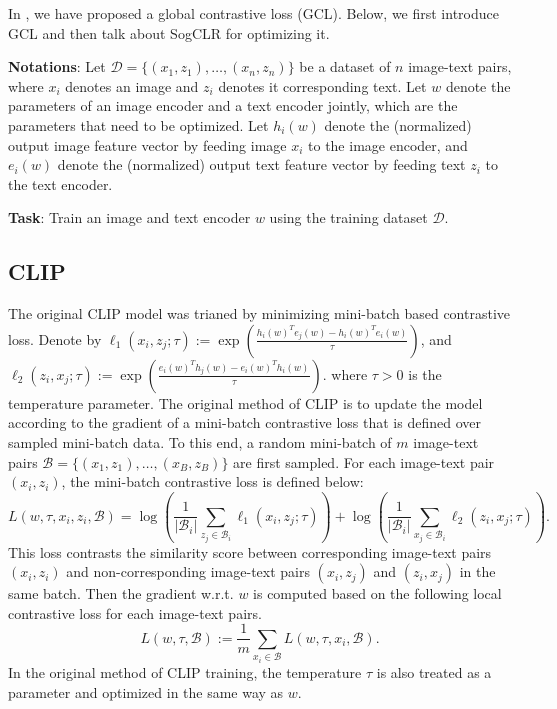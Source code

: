 \documentclass{article}
\begin{document}
In \cite{yuan2022provable}, we have proposed a global contrastive loss (GCL). Below, we first introduce GCL and then talk about SogCLR for optimizing it.

\textbf{Notations}: Let \(\mathcal{D}= \{ (x_1, z_1), \ldots, (x_n, z_n)\}\) be a dataset of \(n\) image-text pairs, where \(x_i\) denotes an image and \(z_i\) denotes it corresponding text. Let \(w\) denote the parameters of an image encoder and a text encoder jointly, which are the parameters that need to be optimized. Let \(h_i(w)\) denote the (normalized) output image feature vector by feeding image \(x_i\) to the image encoder, and \(e_i(w)\) denote the (normalized) output text feature vector by feeding text \(z_i\) to the text encoder.

\textbf{Task}: Train an image and text encoder \(w\) using the training dataset \(\mathcal{D}\).

\subsection{CLIP}
The original CLIP model was trianed by minimizing mini-batch based contrastive loss. 
Denote by  $\ell_1(x_i, z_j; \tau):= \exp(\frac{h_i(w)^Te_j(w)- h_i(w)^Te_i(w)}{\tau})$, and  $\ell_2(z_i, x_j; \tau):= \exp(\frac{e_i(w)^Th_j(w)- e_i(w)^Th_i(w)}{\tau})$. 
where \(\tau> 0\) is the temperature parameter. The original method of CLIP is to update the model according to the gradient of a  mini-batch  contrastive loss that is defined over sampled mini-batch data. To this end, a random mini-batch of \(m\) image-text pairs \(\mathcal{B}= \{ (x_1, z_1), \ldots, (x_B, z_B)\}\) are first sampled. For each image-text pair $(x_i, z_i)$, the mini-batch contrastive loss is defined below: 
\begin{equation*}
  L(w, \tau, x_i, z_i,  \mathcal{B})= \log \left(\frac{1}{|\mathcal B_i|}\sum_{z_j\in \mathcal{B}_i} \ell_1(x_i, z_j; \tau)\right)+  \log \left(\frac{1}{|\mathcal B_i|}\sum_{x_j\in \mathcal{B}_i} \ell_2(z_i, x_j; \tau)\right).
\end{equation*}
This loss contrasts the similarity score between corresponding image-text pairs \((x_i, z_i)\) and non-corresponding image-text pairs \((x_i, z_j)\) and \((z_i, x_j)\) in the same batch. Then the gradient w.r.t. \(w\) is computed based on the following local contrastive loss for each image-text pairs. 
\begin{equation*}
  L(w, \tau, \mathcal{B}):= \frac{1}{m} \sum_{x_i\in \mathcal{B}} L(w, \tau, x_i, \mathcal{B}).
\end{equation*}
In the original method of CLIP training, the temperature $\tau$ is also treated as a parameter and optimized in the same way as $w$. 
\end{document}
